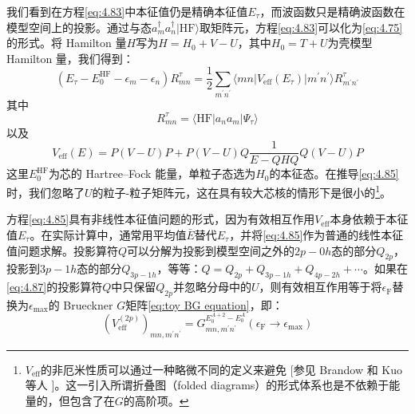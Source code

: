 我们看到在方程\ref{eq:4.83}中本征值仍是精确本征值$E_{\tau}$，而波函数只是精确波函数在模型空间上的投影。通过与态$a^{\dagger}_{m}a^{\dagger}_{n}|\text{HF}\rangle$取矩阵元，方程\ref{eq:4.83}可以化为\ref{eq:4.75}的形式。将
Hamilton 量$H$写为$H=H_{0}+V-U$，其中$H_{0}=T+U$为壳模型 Hamilton 量，我们得到：
\begin{equation}
(E_{\tau}-E^{\text{HF}}_{0}-\epsilon_{m}-\epsilon_{n})R^{\tau}_{mn}=\frac{1}{2}\sum_{m^{\prime}n^{\prime}}\langle mn|V_{\text{eff}}(E_{\tau})|m^{\prime}n^{\prime}\rangle R^{\tau}_{m^{\prime}n^{\prime}}\label{eq:4.85}
\end{equation}
其中
\begin{equation}
R^{\tau}_{mn}=\langle\text{HF}|a_{n}a_{m}|\Psi_{\tau}\rangle\label{eq:4.86}
\end{equation}
以及
\begin{equation}
V_{\text{eff}}(E)=P(V-U)P+P(V-U)Q\frac{1}{E-QHQ}Q(V-U)P\label{eq:4.87}
\end{equation}
这里$E^{\text{HF}}_{0}$为芯的 Hartree–Fock 能量，单粒子态选为$H_{0}$的本征态。在推导\ref{eq:4.85}时，我们忽略了$U$的粒子-粒子矩阵元，这在具有较大芯核的情形下是很小的\footnote{$V_{\text{eff}}$的非厄米性质可以通过一种略微不同的定义来避免 {[}参见 Brandow \cite{Br67a}
和 Kuo 等人 \cite{KLR71}{]}。这一引入所谓折叠图（folded diagrams）的形式体系也是不依赖于能量的，但包含了在$G$的高阶项。}。

方程\ref{eq:4.85}具有非线性本征值问题的形式，因为有效相互作用$V_{\text{eff}}$本身依赖于本征值$E_{\tau}$。在实际计算中，通常用平均值$\bar{E}$替代$E_{\tau}$，并将\ref{eq:4.85}作为普通的线性本征值问题求解。投影算符$Q$可以分解为投影到模型空间之外的$2p-0h$态的部分$Q_{2p}$，投影到$3p-1h$态的部分$Q_{3p-1h}$，等等：$Q=Q_{2p}+Q_{3p-1h}+Q_{4p-2h}+\cdots$。如果在\ref{eq:4.87}的投影算符$Q$中只保留$Q_{2p}$并忽略分母中的$U$，则有效相互作用等于将$\epsilon_{\text{F}}$替换为$\epsilon_{\max}$的
Brueckner $G$矩阵\ref{eq:toy BG equation}，即：
\begin{equation}
(V^{(2p)}_{\text{eff}})_{mn,m^{\prime}n^{\prime}}=G^{E^{A+2}_{0}-E^{A}_{0}}_{mn,m^{\prime}n^{\prime}}(\epsilon_{\text{F}}\rightarrow\epsilon_{\max})\label{eq:4.88}
\end{equation}

